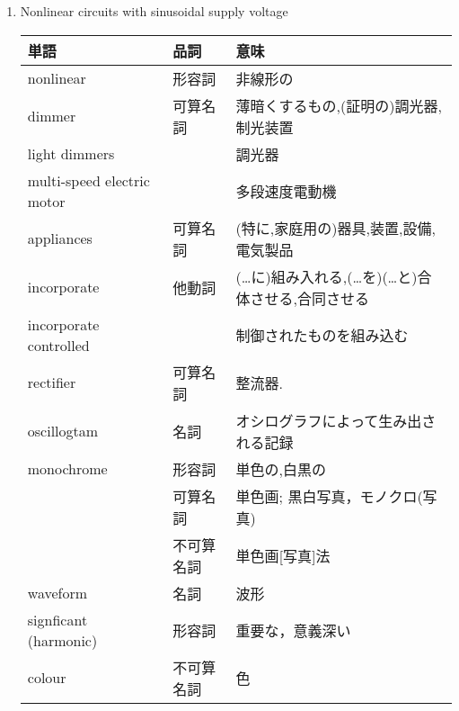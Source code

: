 \documentclass[fleqn,9pt,a4paper,dvipdfmx]{jsarticle}
\begin{document}
\begin{enumerate}
    \item Nonlinear circuits with sinusoidal supply voltage
\begin{table}[h]
  \begin{tabular}{l|ll}
  単語                         & 品詞                             & 意味                             \\ \hline
  nonlinear                  & 形容詞                            & 非線形の                           \\ \hline
  dimmer                     & 可算名詞                           & 薄暗くするもの,(証明の)調光器,制光装置          \\
  light dimmers              &                                & 調光器                            \\ \hline
  multi-speed electric motor &                                & 多段速度電動機                        \\ \hline
  appliances                 & 可算名詞                           & (特に,家庭用の)器具,装置,設備,電気製品         \\ \hline
  incorporate                & 他動詞                            & (…に)組み入れる,(…を)(…と)合体させる,合同させる \\ \hline
  incorporate controlled     &                                & 制御されたものを組み込む                   \\ \hline
  rectifier                  & 可算名詞                           & 整流器.                           \\ \hline
  oscillogtam                & 名詞                             & オシログラフによって生み出される記録             \\ \hline
  monochrome                 & 形容詞                            & 単色の,白黒の                        \\
                             & 可算名詞                           & 単色画; 黒白写真，モノクロ(写真)            \\
                             & 不可算名詞                          & 単色画{[}写真{]}法                  \\ \hline
  waveform                   & 名詞                             & 波形                             \\ \hline
  signficant (harmonic)      & 形容詞                            & 重要な，意義深い                      \\ \hline
  colour                     & 不可算名詞                          & 色                              \\ \hline

\end{tabular}
\end{table}
\end{enumerate}
\end{document}
